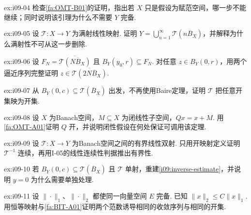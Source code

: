 \begin{FAExercise}[定义域完备性的唯一使用点]{ex:i09-04}
检查\autoref{fa:OMT-B01}的证明，指出若 \(\displaystyle X\) 只是假设为赋范空间，哪一步不能继续；同时说明该引理为什么不需要 \(\displaystyle Y\) 完备.
\end{FAExercise}

\begin{FAExercise}[Baire覆盖]{ex:i09-05}
设 \(\displaystyle \mathcal T:X\to Y\) 为满射线性映射. 证明 \(\displaystyle Y=\bigcup_{n=1}^{\infty}\mathcal T(n\overline B_X)\)，并解释为什么满射性不可从这一步删除.
\end{FAExercise}

\begin{FAExercise}[从非中心球抽取零中心球]{ex:i09-06}
设 \(\displaystyle F_N=\overline{\mathcal T(N\overline B_X)}\) 且 \(\displaystyle B_Y(y_0,r)\subseteq F_N\). 对任意 \(\displaystyle z\in B_Y(0,r)\)，用两个逼近序列完整证明 \(\displaystyle z\in\overline{\mathcal T(2N\overline B_X)}\).
\end{FAExercise}

\begin{FAExercise}[开映射证明的最后一步]{ex:i09-07}
从 \(\displaystyle B_Y(0,c)\subseteq\mathcal T(\overline B_X)\) 出发，不再使用Baire定理，证明 \(\displaystyle \mathcal T\) 把任意开集映为开集.
\end{FAExercise}

\begin{FAExercise}[商映射开放性]{ex:i09-08}
设 \(\displaystyle X\) 为Banach空间，\(\displaystyle M\subseteq X\) 为闭线性子空间，\(\displaystyle Qx=x+M\). 用\autoref{fa:OMT-A01}证明 \(\displaystyle Q\) 开，并说明闭性假设在何处保证可调用该定理.
\end{FAExercise}

\begin{FAExercise}[有界逆定理]{ex:i09-09}
设 \(\displaystyle \mathcal T:X\to Y\) 为Banach空间之间的有界线性双射. 只用开映射定义证明 \(\displaystyle \mathcal T^{-1}\) 连续，再用I-05的线性连续性判据推出有界性.
\end{FAExercise}

\begin{FAExercise}[逆映射定量估计]{ex:i09-10}
若 \(\displaystyle B_Y(0,c)\subseteq\mathcal T(\overline B_X)\) 且 \(\displaystyle \mathcal T\) 单射，重建\autoref{i09:inverse-estimate}，并说明 \(\displaystyle y=0\) 为什么需要单独处理.
\end{FAExercise}

\begin{FAExercise}[Banach范数等价]{ex:i09-11}
设 \(\displaystyle \|\cdot\|_1\)、\(\displaystyle \|\cdot\|_2\) 都使同一向量空间 \(\displaystyle E\) 完备. 已知 \(\displaystyle \|x\|_2\leqslant C\|x\|_1\). 用恒等映射与\autoref{fa:BIT-A01}证明两个范数诱导相同的收敛序列与相同的开集.
\end{FAExercise}

